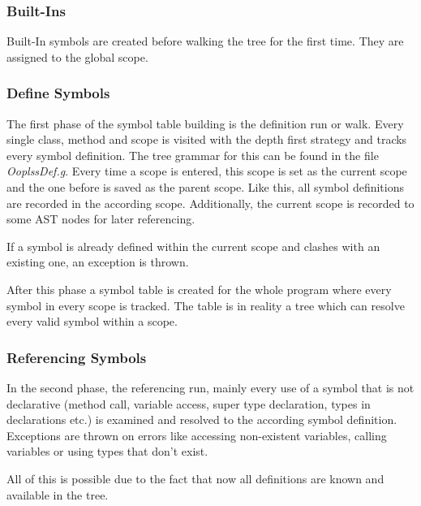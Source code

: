\subsubsection{Built-Ins}
Built-In symbols are created before walking the tree for the first time.
They are assigned to the global scope.

\subsubsection{Define Symbols}
The first phase of the symbol table building is the definition run or
walk.  Every single class, method and scope is visited with the depth
first strategy and tracks every symbol definition. The tree grammar for
this can be found in the file \emph{OoplssDef.g}. Every time a scope
is entered, this scope is set as the current scope and the one before
is saved as the parent scope.  Like this, all symbol definitions are
recorded in the according scope.  Additionally, the current scope is
recorded to some AST nodes for later referencing.

If a symbol is already defined within the current scope and clashes with
an existing one, an exception is thrown.

After this phase a symbol table is created for the whole program where
every symbol in every scope is tracked. The table is in reality a tree
which can resolve every valid symbol within a scope.


\subsubsection{Referencing Symbols}
In the second phase, the referencing run, mainly every use of a symbol that is 
not declarative (method call, variable access, super type declaration, types 
in declarations etc.) is examined and resolved to the according symbol definition. 
Exceptions are thrown on errors like accessing non-existent variables, calling 
variables or using types that don't exist.

All of this is possible due to the fact that now all definitions are known and available
in the tree.

